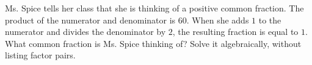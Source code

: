 Ms. Spice tells her class that she is thinking of a positive common fraction. The product of the numerator and denominator is $60$. When she adds $1$ to the numerator and divides the denominator by $2$, the resulting fraction is equal to $1$. What common fraction is Ms. Spice thinking of? Solve it algebraically, without listing factor pairs.
